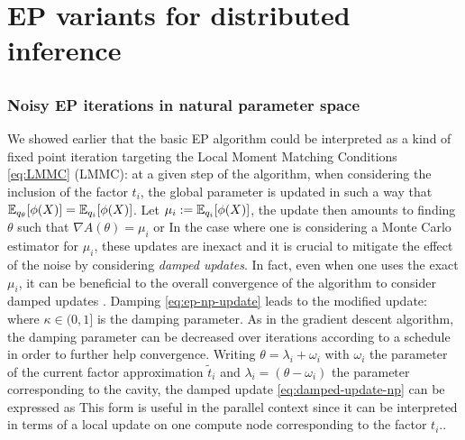 \section{EP variants for distributed inference}
\subsection{}
\subsubsection*{Noisy EP iterations in natural parameter space}
We showed earlier that the basic EP algorithm could be interpreted as a kind of fixed point iteration targeting the Local Moment Matching Conditions \eqref{eq:LMMC} (LMMC): at a given step of the algorithm, when considering the inclusion of the factor $t_i$, the global parameter is updated in such a way that $\mathbb E_{q_\theta}[\phi(X)]= \mathbb E_{q_i}[\phi(X)]$. Let $\mu_i:=\mathbb E_{q_i}[\phi(X)]$, the update then amounts to finding $\theta$ such that $\nabla A(\theta) = \mu_i$ or
%
%
In the case where one is considering a Monte Carlo estimator for $\mu_i$, these updates are inexact and it is crucial to mitigate the effect of the noise by considering \emph{damped updates}. In fact, even when one uses the exact $\mu_i$, it can be beneficial to the overall convergence of the algorithm to consider damped updates \citep{heskes03}. Damping \eqref{eq:ep-np-update} leads to the modified update:
%
%
where $\kappa \in(0,1]$ is the damping parameter. As in the gradient descent algorithm, the damping parameter can be decreased over iterations according to a schedule in order to further help convergence.
Writing $\theta=\lambda_i+\omega_i$ with $\omega_i$ the parameter of the current factor approximation $\tilde t_i$ and $\lambda_i=(\theta-\omega_i)$ the parameter corresponding to the cavity, the damped update \eqref{eq:damped-update-np} can be expressed as
%
%
This form is useful in the parallel context since it can be interpreted in terms of a local update on one compute node corresponding to the factor $t_i$..
